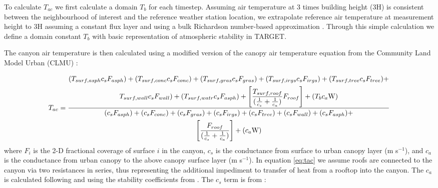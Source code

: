\documentclass[journal abbreviation, manuscript]{copernicus}
\begin{document}
To calculate $T_{ac}$ we first calculate a domain \ensuremath{T_{b}} for each timestep. Assuming air temperature at 3 times building height (3H) is consistent between the neighbourhood of interest and the reference weather station location, we extrapolate reference air temperature at measurement height to 3H assuming a constant flux layer and using a bulk Richardson number-based approximation \citep{Mascart1995}. Through this simple calculation we define a domain constant \ensuremath{T_{b}} with basic representation of atmospheric stability in TARGET.  

The canyon air temperature is then calculated using a modified version of the canopy air temperature equation from the Community Land Model Urban (CLMU) \citep{Oleson2010}:

\begin{equation}
 \label{eq:tac}
  T_{ac} = 
  \frac{\begin{gathered} (T_{surf,asph} \ensuremath{c_{s}} F_{asph}) +  (T_{surf,conc} \ensuremath{c_{s}} F_{conc}) +  (T_{surf,gras} \ensuremath{c_{s}} F_{gras}) + (T_{surf,irgs} \ensuremath{c_{s}} F_{irgs}) + (T_{surf,tree} \ensuremath{c_{s}} F_{tree})  + \\ T_{surf,wall} \ensuremath{c_{s}} F_{wall}) +   (T_{surf,watr} \ensuremath{c_{s}} F_{asph}) +  \Bigg[\frac{T_{surf,roof}}  {(\frac{1}{\ensuremath{c_{s}}}+\frac{1}{\ensuremath{c_{a}}})} F_{roof}\Bigg] + (\ensuremath{T_{b}} \ensuremath{c_{a}} $W$)\end{gathered}}{\begin{gathered} 
      (\ensuremath{c_{s}} F_{asph}) +   (\ensuremath{c_{s}} F_{conc}) +  ( \ensuremath{c_{s}} F_{gras}) + ( \ensuremath{c_{s}} F_{irgs}) + ( \ensuremath{c_{s}} F_{tree})  +  (\ensuremath{c_{s}} F_{wall}) +   (\ensuremath{c_{s}} F_{asph}) + \\ \Bigg[\frac{F_{roof}}{(\frac{1}{\ensuremath{c_{s}}}+\frac{1}{\ensuremath{c_{a}}})}\Bigg] +(\ensuremath{c_{a}} $W$) \end{gathered}}
\end{equation} where $F_{i} $ is the 2-D fractional coverage of surface $i$ in the canyon,  \ensuremath{c_{s}} is the conductance from surface to urban canopy layer (m s$^{-1}$), and \ensuremath{c_{a}} is the conductance from urban canopy to the above canopy surface layer (m s$^{-1}$).
In equation \ref{eq:tac} we assume roofs are connected to the canyon via two resistances in series, thus representing the  additional impediment to transfer of heat from a rooftop into the canyon.  The \ensuremath{c_{a}} is calculated following \cite{Masson2000} and using the stability coefficients from \cite{Mascart1995}. %
The \ensuremath{c_{s}} term is from \cite{Masson2000}:
\end{document}
